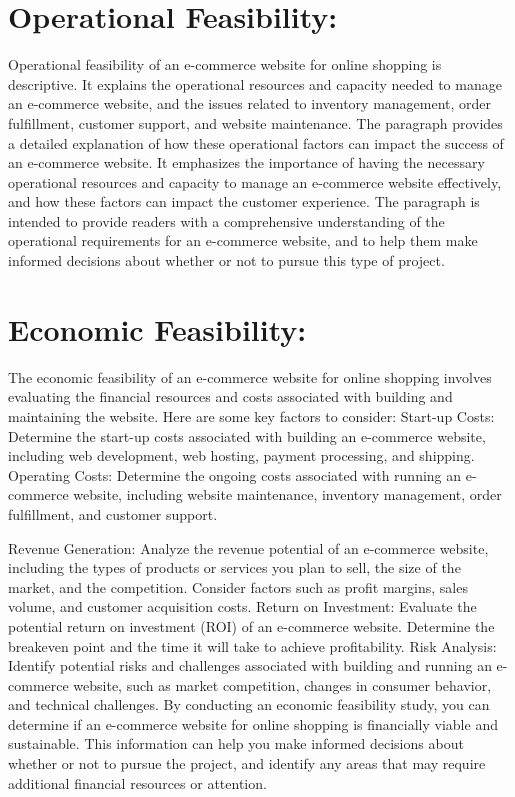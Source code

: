 \documentclass{article}
\begin{document}
\section{Operational Feasibility:}
Operational feasibility of an e-commerce website for online shopping is descriptive. It explains the operational resources and capacity needed to manage an e-commerce website, and the issues related to inventory management, order fulfillment, customer support, and website maintenance. The paragraph provides a detailed explanation of how these operational factors can impact the success of an e-commerce website. It emphasizes the importance of having the necessary operational resources and capacity to manage an e-commerce website effectively, and how these factors can impact the customer experience. The paragraph is intended to provide readers with a comprehensive understanding of the operational requirements for an e-commerce website, and to help them make informed decisions about whether or not to pursue this type of project.
\section{Economic Feasibility:}

The economic feasibility of an e-commerce website for online shopping involves evaluating the financial resources and costs associated with building and maintaining the website. Here are some key factors to consider:
Start-up Costs: Determine the start-up costs associated with building an e-commerce website, including web development, web hosting, payment processing, and shipping.
Operating Costs: Determine the ongoing costs associated with running an e-commerce website, including website maintenance, inventory management, order fulfillment, and customer support.

Revenue Generation: Analyze the revenue potential of an e-commerce website, including the types of products or services you plan to sell, the size of the market, and the competition. Consider factors such as profit margins, sales volume, and customer acquisition costs.
Return on Investment: Evaluate the potential return on investment (ROI) of an e-commerce website. Determine the breakeven point and the time it will take to achieve profitability.
Risk Analysis: Identify potential risks and challenges associated with building and running an e-commerce website, such as market competition, changes in consumer behavior, and technical challenges.
By conducting an economic feasibility study, you can determine if an e-commerce website for online shopping is financially viable and sustainable. This information can help you make informed decisions about whether or not to pursue the project, and identify any areas that may require additional financial resources or attention.
\end{document}
